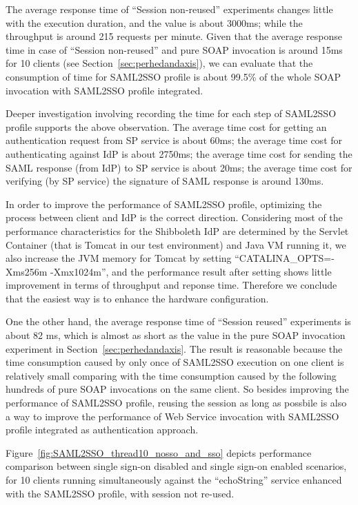 \documentclass[conference]{IEEEtran}
\begin{document}
The average response time of ``Session non-reused'' experiments changes little
with the execution duration, and the value is about 3000ms; while the throughput is around 215
requests per minute. Given that the average response time in case of ``Session non-reused'' and
pure SOAP invocation is around 15ms for 10 clients (see Section~\ref{sec:perhedandaxis}),
we can evaluate that the consumption of time for SAML2SSO profile is about 99.5\% of
the whole SOAP invocation with SAML2SSO profile integrated. 

Deeper investigation involving recording the time for each step of SAML2SSO profile
supports the above observation. The average time cost for getting an authentication request
from SP service is about 60ms; the average time cost for authenticating against IdP is about
2750ms; the average time cost for sending the SAML response (from IdP) to SP service is
about 20ms; the average time cost for verifying (by SP service) the signature of SAML
response is around 130ms.

In order to improve the performance of SAML2SSO profile, optimizing the process
between client and IdP is the correct direction. Considering most of the performance 
characteristics for the Shibboleth IdP are determined by the Servlet Container (that is Tomcat 
in our test environment) and Java VM running it, we also increase the JVM memory for Tomcat 
by setting ``CATALINA\_OPTS=-Xms256m -Xmx1024m'', and the performance result after setting
shows little improvement in terms of throughput and reponse time.
Therefore we conclude that the easiest way is to enhance the hardware configuration.

One the other hand, the average response time of ``Session reused'' experiments
is about 82 ms, which is almost as short as the value in the pure SOAP invocation experiment in
Section~\ref{sec:perhedandaxis}. The result is reasonable because the time consumption
caused by only once of SAML2SSO execution on one client is relatively small comparing with
the time consumption caused by the following hundreds of pure SOAP invocations on the
same client. So besides improving the performance of SAML2SSO profile, reusing 
the session as long as possbile is also a way to improve the performance of 
Web Service invocation with SAML2SSO profile integrated as authentication approach.

Figure~\ref{fig:SAML2SSO_thread10_nosso_and_sso} depicts performance comparison between single 
sign-on disabled and single sign-on enabled scenarios, for 10 clients running simultaneously 
against the ``echoString'' service enhanced with the SAML2SSO profile, with session not re-used.
\end{document}
